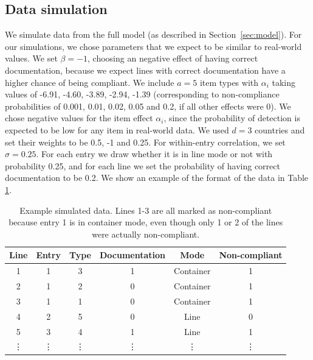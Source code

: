 \documentclass{article}
\begin{document}
\subsection{Data simulation}
We simulate data from the full model (as described in Section~\ref{sec:model}). For our simulations, we chose parameters that we expect to be similar to real-world values. We set \(\beta=-1\), choosing an negative effect of having correct documentation, because we expect lines with correct documentation have a higher chance of being compliant. We include $a=5$ item types with \(\alpha_i\) taking values of -6.91, -4.60, -3.89, -2.94, -1.39 (corresponding to non-compliance probabilities of 0.001, 0.01, 0.02, 0.05 and 0.2, if all other effects were 0). We chose negative values for the item effect $\alpha_i$, since the probability of detection is expected to be low for any item in real-world data. We used $d=3$ countries and set their weights to be 0.5, -1 and 0.25.
For within-entry correlation, we set \(\sigma = 0.25\). For each entry we draw whether it is in line mode or not with probability 0.25, and for each line we set the probability of having correct documentation to be 0.2. We show an example of the format of the data in Table \ref{table:example_data}.

\vspace{0.1cm}
\begin{table}[h]
\caption{Example simulated data. Lines 1-3 are all marked as non-compliant because entry 1 is in container mode, even though only 1 or 2 of the lines were actually non-compliant.}
\label{table:example_data}
\begin{center}

\begin{tabular}{|c|c|c|c|c|c|}
\hline 
Line & Entry & Type & Documentation & Mode & Non-compliant \\ 
\hline 
1 & 1 & 3 & 1  & Container & 1 \\ 
\hline 
2 & 1 & 2 & 0  & Container & 1 \\ 
\hline 
3 & 1 & 1 & 0 & Container & 1 \\ 
\hline 
4 & 2 & 5 & 0 &Line & 0 \\ 
\hline 
5 & 3 & 4 & 1 &Line & 1 \\ 
\hline 
\vdots & \vdots & \vdots & \vdots & \vdots & \vdots \\ 
\hline 
\end{tabular} 

\end{center}
\end{table}
\end{document}
